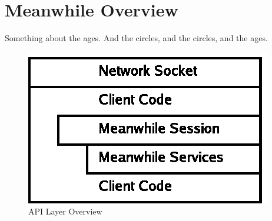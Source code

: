 

\chapter{Meanwhile Overview}

\par{} Something about the ages. And the circles, and the circles, and
the ages.

\begin{figure}[!h]
  \begin{center}
    \includegraphics{diagrams/overview_layers.eps}
  \end{center}
  \caption{API Layer Overview}
  \label{overview_layers}
\end{figure}
